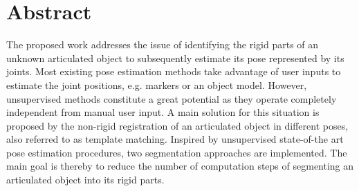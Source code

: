 \chapter{Abstract}

The proposed work addresses the issue of identifying the rigid parts of an unknown articulated object to subsequently estimate its pose represented by its joints. Most existing pose estimation methods take advantage of user inputs to estimate the joint positions, e.g. markers or an object model. However, unsupervised methods constitute a great potential as they operate completely independent from manual user input. A main solution for this situation is proposed by the non-rigid registration of an articulated object in different poses, also referred to as template matching. Inspired by unsupervised state-of-the art pose estimation procedures, two segmentation approaches are implemented. The main goal is thereby to reduce the number of computation steps of segmenting an articulated object into its rigid parts.
